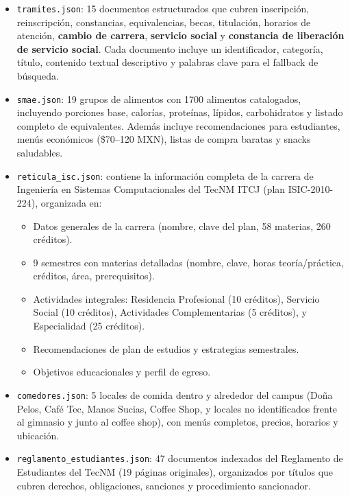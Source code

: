 \begin{itemize}
    \item \texttt{tramites.json}: 15 documentos estructurados que cubren inscripción, reinscripción, constancias, equivalencias, becas, titulación, horarios de atención, \textbf{cambio de carrera}, \textbf{servicio social} y \textbf{constancia de liberación de servicio social}. Cada documento incluye un identificador, categoría, título, contenido textual descriptivo y palabras clave para el fallback de búsqueda.
    
    \item \texttt{smae.json}: 19 grupos de alimentos con 1700 alimentos catalogados, incluyendo porciones base, calorías, proteínas, lípidos, carbohidratos y listado completo de equivalentes. Además incluye recomendaciones para estudiantes, menús económicos (\$70--120 MXN), listas de compra baratas y snacks saludables.
    
    \item \texttt{reticula\_isc.json}: contiene la información completa de la carrera de Ingeniería en Sistemas Computacionales del TecNM ITCJ (plan ISIC-2010-224), organizada en:
    \begin{itemize}
        \item Datos generales de la carrera (nombre, clave del plan, 58 materias, 260 créditos).
        \item 9 semestres con materias detalladas (nombre, clave, horas teoría/práctica, créditos, área, prerequisitos).
        \item Actividades integrales: Residencia Profesional (10 créditos), Servicio Social (10 créditos), Actividades Complementarias (5 créditos), y Especialidad (25 créditos).
        \item Recomendaciones de plan de estudios y estrategias semestrales.
        \item Objetivos educacionales y perfil de egreso.
    \end{itemize}
    
    \item \texttt{comedores.json}: 5 locales de comida dentro y alrededor del campus (Doña Pelos, Café Tec, Manos Sucias, Coffee Shop, y locales no identificados frente al gimnasio y junto al coffee shop), con menús completos, precios, horarios y ubicación.
    
    \item \texttt{reglamento\_estudiantes.json}: 47 documentos indexados del Reglamento de Estudiantes del TecNM (19 páginas originales), organizados por títulos que cubren derechos, obligaciones, sanciones y procedimiento sancionador.
\end{itemize}

